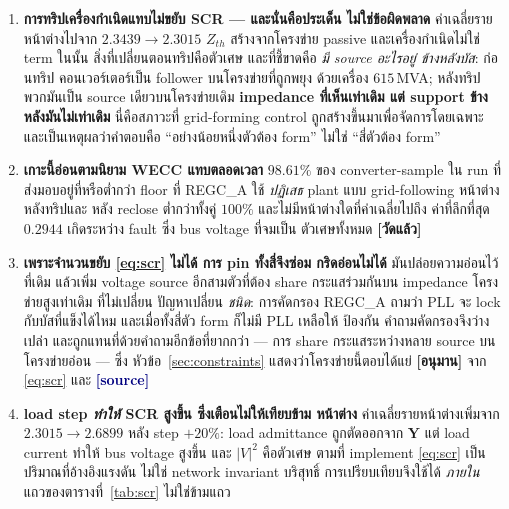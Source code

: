 \documentclass[12pt,a4paper]{article}
\theoremstyle{remark}
\newcommand{\measured}{\textcolor{ok}{\textbf{[วัดแล้ว]}}}
\newcommand{\derived}{\textcolor{warn}{\textbf{[อนุมาน]}}}
\newcommand{\sourcecode}{\textcolor{navy}{\textbf{[source]}}}
\begin{document}
\begin{enumerate}[leftmargin=1.9em,itemsep=3pt]
\item \textbf{การทริปเครื่องกำเนิดแทบไม่ขยับ SCR --- และนั่นคือประเด็น
      ไม่ใช่ข้อผิดพลาด} ค่าเฉลี่ยรายหน้าต่างไปจาก $2.3439 \to 2.3015$
      $Z_{th}$ สร้างจากโครงข่าย passive และเครื่องกำเนิดไม่ใช่ term ในนั้น
      สิ่งที่เปลี่ยนตอนทริปคือตัวเศษ และที่ชี้ขาดคือ \emph{มี source อะไรอยู่
      ข้างหลังบัส}: ก่อนทริป คอนเวอร์เตอร์เป็น follower บนโครงข่ายที่ถูกพยุง
      ด้วยเครื่อง $615$\,MVA; หลังทริป พวกมันเป็น source เดียวบนโครงข่ายเดิม
      \textbf{impedance ที่เห็นเท่าเดิม แต่ support ข้างหลังมันไม่เท่าเดิม}
      นี่คือสภาวะที่ grid-forming control ถูกสร้างขึ้นมาเพื่อจัดการโดยเฉพาะ
      และเป็นเหตุผลว่าคำตอบคือ ``อย่างน้อยหนึ่งตัวต้อง form'' ไม่ใช่
      ``สี่ตัวต้อง form''

\item \textbf{เกาะนี้อ่อนตามนิยาม WECC แทบตลอดเวลา} $98.61\%$ ของ
      converter-sample ใน run ที่ส่งมอบอยู่ที่หรือต่ำกว่า floor ที่ REGC\_A
      ใช้ \emph{ปฏิเสธ} plant แบบ grid-following หน้าต่างหลังทริปและ
      หลัง reclose ต่ำกว่าทั้งคู่ $100\%$ และไม่มีหน้าต่างใดที่ค่าเฉลี่ยไปถึง
      ค่าที่ลึกที่สุด $0.2944$ เกิดระหว่าง fault ซึ่ง bus voltage ที่จมเป็น
      ตัวเศษทั้งหมด \measured

\item \textbf{เพราะจำนวนขยับ \eqref{eq:scr} ไม่ได้ การ pin ทั้งสี่จึงซ่อม
      กริดอ่อนไม่ได้} มันปล่อยความอ่อนไว้ที่เดิม แล้วเพิ่ม voltage source
      อีกสามตัวที่ต้อง share กระแสร่วมกันบน impedance โครงข่ายสูงเท่าเดิม
      ที่ไม่เปลี่ยน ปัญหาเปลี่ยน \emph{ชนิด}: การคัดกรอง REGC\_A ถามว่า PLL
      จะ lock กับบัสที่แข็งได้ไหม และเมื่อทั้งสี่ตัว form ก็ไม่มี PLL เหลือให้
      ป้องกัน คำถามคัดกรองจึงว่างเปล่า และถูกแทนที่ด้วยคำถามอีกข้อที่ยากกว่า
      --- การ share กระแสระหว่างหลาย source บนโครงข่ายอ่อน --- ซึ่ง
      หัวข้อ~\ref{sec:constraints} แสดงว่าโครงข่ายนี้ตอบได้แย่ \derived{}
      จาก \eqref{eq:scr} และ \sourcecode

\item \textbf{load step \emph{ทำให้} SCR สูงขึ้น ซึ่งเตือนไม่ให้เทียบข้าม
      หน้าต่าง} ค่าเฉลี่ยรายหน้าต่างเพิ่มจาก $2.3015 \to 2.6899$ หลัง step
      $+20\%$: load admittance ถูกตัดออกจาก $\mathbf{Y}$ แต่ load current
      ทำให้ bus voltage สูงขึ้น และ $|V|^2$ คือตัวเศษ ตามที่ implement
      \eqref{eq:scr} เป็นปริมาณที่อ้างอิงแรงดัน ไม่ใช่ network invariant
      บริสุทธิ์ การเปรียบเทียบจึงใช้ได้ \emph{ภายใน} แถวของตารางที่~\ref{tab:scr}
      ไม่ใช่ข้ามแถว
\end{enumerate}
\end{document}

